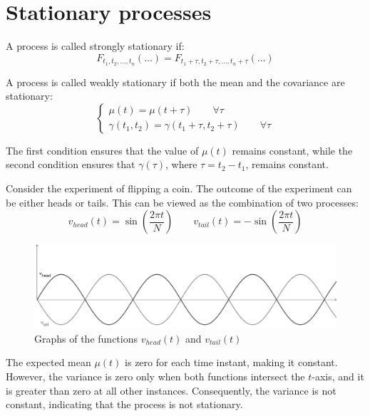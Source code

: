 \section{Stationary processes}

\begin{definition}
    A process is called strongly stationary if:
    \[F_{t_1,t_2,\dots,t_n}(\dots)=F_{t_1+\tau,t_2+\tau,\dots,t_n+\tau}(\dots)\]
\end{definition}

\begin{definition}
    A process is called weakly stationary if both the mean and the covariance are stationary:
    \[\begin{cases}
        \mu(t)=\mu(t+\tau) \qquad \forall \tau \\
        \gamma(t_1,t_2)=\gamma(t_1+\tau,t_2+\tau) \qquad \forall \tau
    \end{cases}\]
\end{definition}
The first condition ensures that the value of $\mu(t)$ remains constant, while the second condition ensures that $\gamma(\tau)$, where $\tau=t_2-t_1$, remains constant.
\begin{example}
    Consider the experiment of flipping a coin. 
    The outcome of the experiment can be either heads or tails. 
    This can be viewed as the combination of two processes:
    \[v_{head}(t)=\sin\left(\dfrac{2 \pi t}{N}\right) \qquad v_{tail}(t)=-\sin\left(\dfrac{2 \pi t}{N}\right)\]
    \begin{figure}[H]
        \centering
        \includegraphics[width=0.75\linewidth]{images/tailhead.png}
        \caption{Graphs of the functions $v_{head}(t)$ and $v_{tail}(t)$}
    \end{figure}
    The expected mean $\mu(t)$ is zero for each time instant, making it constant.
    However, the variance is zero only when both functions intersect the $t$-axis, and it is greater than zero at all other instances.
    Consequently, the variance is not constant, indicating that the process is not stationary.
\end{example}
\newpage
